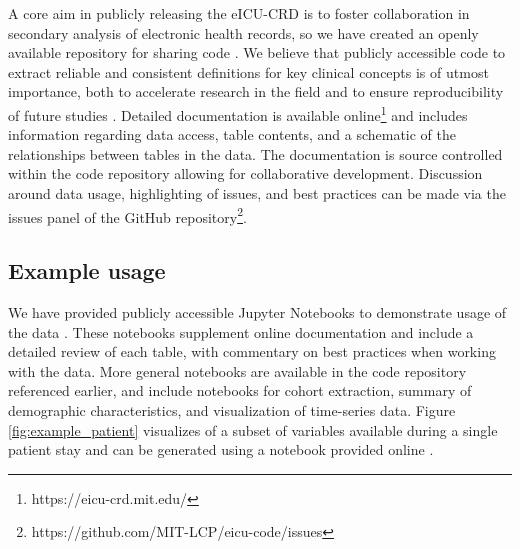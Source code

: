 \documentclass[english]{article}
\begin{document}
A core aim in publicly releasing the eICU-CRD is to foster collaboration in secondary analysis of electronic health records, so we have created an openly available repository for sharing code \cite{eicu-code}. We believe that publicly accessible code to extract reliable and consistent definitions for key clinical concepts is of utmost importance, both to accelerate research in the field and to ensure reproducibility of future studies \cite{johnson2017reproducibility}.
Detailed documentation is available online\footnote{https://eicu-crd.mit.edu/} and includes information regarding data access, table contents, and a schematic of the relationships between tables in the data.
The documentation is source controlled within the code repository allowing for collaborative development\cite{eicu-code}. Discussion around data usage, highlighting of issues, and best practices can be made via the issues panel of the GitHub repository\footnote{https://github.com/MIT-LCP/eicu-code/issues}.

\subsection*{Example usage}\label{example-usage}

We have provided publicly accessible Jupyter Notebooks \cite{kluyver2016jupyter, pergra2007ipython} to demonstrate usage of the data \cite{eicu-data-paper}.
These notebooks supplement online documentation and include a detailed review of each table, with commentary on best practices when working with the data. More general notebooks are available in the code repository referenced earlier, and include notebooks for cohort extraction, summary of demographic characteristics, and visualization of time-series data. Figure \ref{fig:example_patient} visualizes of a subset of variables available during a single patient stay and can be generated using a notebook provided online \cite{eicu-data-paper}.
\end{document}
